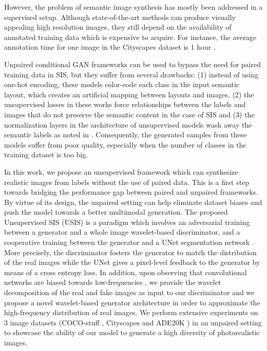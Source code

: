 \documentclass{article}
\begin{document}
However, the problem of semantic image synthesis has mostly been addressed in a supervised setup. Although state-of-the-art methods \cite{wang2018high, schonfeld2021you, park2019semantic, tan2020rethinking, liu2019learning, Zhu2020SEANIS} can produce visually appealing high resolution images, they still depend on the availability of annotated training data which is expensive to acquire. For instance, the average annotation time for one image in the Cityscapes dataset is 1 hour \cite{cordts2016cityscapes}. 

Unpaired conditional GAN frameworks \cite{zhu2017unpaired, huang2018multimodal, lee2018diverse, park2020cut, fu2019geometry, benaim2017one, taigman2017unsupervised, shrivastava2017learning, bousmalis2017unsupervised, amodio2019travelgan, zhang2019harmonic} can be used to bypass the need for paired training data in SIS, but they suffer from several drawbacks: (1) instead of using one-hot encoding, these models color-code each class in the input semantic layout, which creates an artificial mapping between layouts and images, (2) the unsupervised losses in these works force relationships between the labels and images that do not preserve the semantic content in the case of SIS and (3) the normalization layers in the architecture of unsupervised models wash away the semantic labels as noted in \cite{park2019semantic}. Consequently, the generated samples from these models suffer from poor quality, especially when the number of classes in the training dataset is too big.

In this work, we propose an unsupervised framework which can synthesize realistic images from labels without the use of paired data. This is a first step towards bridging the performance gap between paired and unpaired frameworks. By virtue of its design, the unpaired setting can help eliminate dataset biases and push the model towards a better multimodal generation. The proposed Unsupervised SIS (USIS) \cite{eskandar2021usis} is a paradigm which involves an adversarial training between a generator and a whole image wavelet-based discriminator, and a cooperative training between the generator and a UNet segmentation network \cite{schonfeld2020u}. More precisely, the discriminator fosters the generator to match the distribution of the real images while the UNet gives a pixel-level feedback to the generator by means of a cross entropy loss. In addition, upon observing that convolutional networks are biased towards low-frequencies \cite{Chen2021SSDGANMT, Durall2020WatchYU, Dzanic2020FourierSD, Gao2016AHW, Liu2019MultiLevelWC, Williams2018WaveletPF, Liu2020WaveletBasedDN, Kang2017ADC, Liu2019AttributeAwareFA, Wang2020MultilevelWG, Huang2019WaveletDG}, we provide the wavelet decomposition of the real and fake images as input to our discriminator and we propose a novel wavelet-based generator architecture in order to approximate the high-frequency distribution of real images. We perform extensive experiments on 3 image datasets (COCO-stuff \cite{caesar2018coco}, Cityscapes \cite{cordts2016cityscapes} and ADE20K \cite{zhou2017scene}) in an unpaired setting to showcase the ability of our model to generate a high diversity of photorealistic images.
\end{document}
